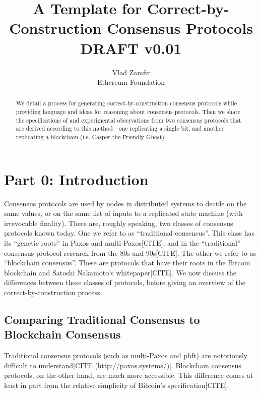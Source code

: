 \documentclass{article}
\theoremstyle{definition}
\begin{document}
\title{A Template for Correct-by-Construction Consensus Protocols \\ \vspace{5mm} \small{DRAFT v0.01}}
\author{Vlad Zamfir \\ Ethereum Foundation}
\maketitle

\begin{abstract}
We detail a process for generating correct-by-construction consensus protocols while providing language and ideas for reasoning about consensus protocols. Then we share the specifications of and experimental observations from two consensus protocols that are derived according to this method---one replicating a single bit, and another replicating a blockchain (i.e. Casper the Friendly Ghost).
\end{abstract}


\section{Part 0: Introduction}

Consensus protocols are used by nodes in distributed systems to decide on the same values, or on the same list of inputs to a replicated state machine (with irrevocable finality). There are, roughly speaking, two classes of consensus protocols known today. One we refer to as ``traditional consensus''. This class has its ``genetic roots'' in Paxos and multi-Paxos[CITE], and in the ``traditional'' consensus protocol research from the 80s and 90s[CITE]. The other we refer to as ``blockchain consensus''. These are protocols that have their roots in the Bitcoin blockchain and Satoshi Nakamoto's whitepaper[CITE]. We now discuss the differences between these classes of protocols, before giving an overview of the correct-by-construction process.

\subsection{Comparing Traditional Consensus to Blockchain Consensus}

Traditional consensus protocols (such as multi-Paxos and pbft) are notoriously difficult to understand[CITE (http://paxos.systems/)]. Blockchain consensus protocols, on the other hand, are much more accessible. This difference comes at least in part from the relative simplicity of Bitcoin's specification[CITE].
\end{document}
